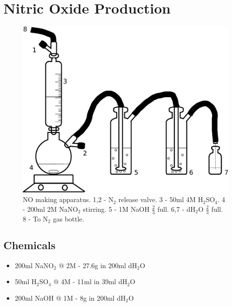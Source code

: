 \section{Nitric Oxide Production}
\begin{figure}
 \centering
 \includegraphics[width=14cm]{./02-materialsmethods/data/drawing.pdf}
 \caption{\footnotesize NO making apparatus. 1,2 - N$_{\textrm{2}}$ release valve. 3 - 50ml 4M H$_{\textrm{2}}$SO$_{\textrm{4}}$. 4 - 200ml 2M NaNO$_{\textrm{2}}$ stirring. 5 - 1M NaOH $\frac{2}{3}$ full. 6,7 - dH$_{\textrm{2}}$O $\frac{2}{3}$ full. 8 - To N$_{\textrm{2}}$ gas bottle.}
\end{figure}
\subsection*{Chemicals}
\begin{itemize}
 \item 200ml NaNO$_{\textrm{2}}$ @ 2M - 27.6g in 200ml dH$_{\textrm{2}}$O
 \item 50ml H$_{\textrm{2}}$SO$_{\textrm{4}}$ @ 4M - 11ml in 39ml dH$_{\textrm{2}}$O
 \item 200ml NaOH @ 1M - 8g in 200ml dH$_{\textrm{2}}$O
\end{itemize}

